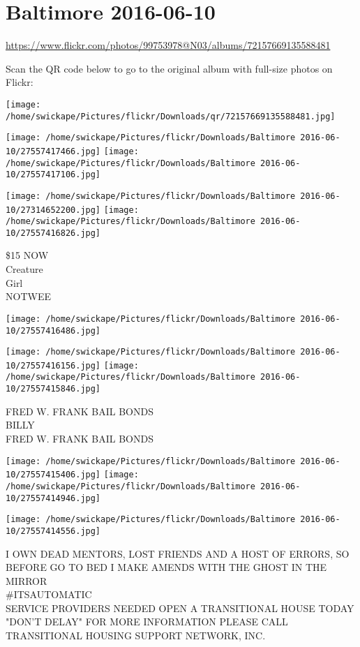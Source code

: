 \documentclass[10pt,letterpaper]{article}
\title{}
\author{}
\date{}
\begin{document}
\section*{Baltimore 2016-06-10}

\url{https://www.flickr.com/photos/99753978@N03/albums/72157669135588481}

Scan the QR code below to go to the original album with full-size photos on Flickr:

\texttt{[image: /home/swickape/Pictures/flickr/Downloads/qr/72157669135588481.jpg]}
\pagebreak

\texttt{[image: /home/swickape/Pictures/flickr/Downloads/Baltimore 2016-06-10/27557417466.jpg]}
\texttt{[image: /home/swickape/Pictures/flickr/Downloads/Baltimore 2016-06-10/27557417106.jpg]}

\texttt{[image: /home/swickape/Pictures/flickr/Downloads/Baltimore 2016-06-10/27314652200.jpg]}
\texttt{[image: /home/swickape/Pictures/flickr/Downloads/Baltimore 2016-06-10/27557416826.jpg]}

\$15 NOW\\
Creature\\
Girl\\
NOTWEE
\pagebreak

\texttt{[image: /home/swickape/Pictures/flickr/Downloads/Baltimore 2016-06-10/27557416486.jpg]}

\vspace{0.25in}
\texttt{[image: /home/swickape/Pictures/flickr/Downloads/Baltimore 2016-06-10/27557416156.jpg]}
\texttt{[image: /home/swickape/Pictures/flickr/Downloads/Baltimore 2016-06-10/27557415846.jpg]}

FRED W. FRANK BAIL BONDS\\
BILLY\\
FRED W. FRANK BAIL BONDS
\pagebreak

\texttt{[image: /home/swickape/Pictures/flickr/Downloads/Baltimore 2016-06-10/27557415406.jpg]}
\texttt{[image: /home/swickape/Pictures/flickr/Downloads/Baltimore 2016-06-10/27557414946.jpg]}

\vspace{0.25in}
\texttt{[image: /home/swickape/Pictures/flickr/Downloads/Baltimore 2016-06-10/27557414556.jpg]}

I OWN DEAD MENTORS, LOST FRIENDS AND A HOST OF ERRORS, SO BEFORE GO TO BED I MAKE AMENDS WITH THE GHOST IN THE MIRROR\\
\#ITSAUTOMATIC\\
SERVICE PROVIDERS NEEDED OPEN A TRANSITIONAL HOUSE TODAY "DON'T DELAY" FOR MORE INFORMATION PLEASE CALL TRANSITIONAL HOUSING SUPPORT NETWORK, INC.
\pagebreak
\end{document}
